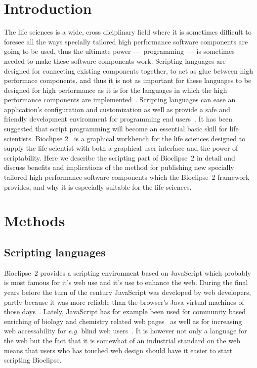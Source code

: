 \documentclass[10pt]{bmc_article}
\newenvironment{bmcformat}{\begin{raggedright}\baselineskip20pt\sloppy\setboolean{publ}{false}}{\end{raggedright}\baselineskip20pt\sloppy}
\begin{document}
\begin{bmcformat}
\section*{Introduction}
The life sciences is a wide, cross diciplinary field where it is sometimes
difficult to foresee all the ways specially tailored high performance software
components are going to be used, thus the ultimate power ---~programming~--- is
sometimes needed to make these software components work. Scripting languages
are designed for connecting existing components together, to act as glue
between high performace components, and thus it is not as important for these
languages to be designed for high performance as it is for the languages in
which the high performance components are implemented~\cite{Ousterhout:1998fk}.
Scripting languages can ease an application's configuration and customization
as well as provide a safe and friendly development environment for programming
end users~\cite{Spinellis:2005fk}.
\pb
It has been suggested that script programming will become an essential basic
skill for life scientists\cite{Aerts:2009uq}. Bioclipse 2~\cite{Spjuth:2009kx}
is a graphical workbench for the life sciences designed to supply the life
scientist with both a graphical user interface and the power of scriptability.
Here we describe the scripting part of Bioclipse~2 in detail and discuss
benefits and implications of the method for publishing new specially tailored
high performance software components which the Bioclipse~2 framework provides,
and why it is especially suitable for the life sciences.

\section*{Methods}

\subsection*{Scripting languages}
Bioclipse~2 provides a scripting environment based on JavaScript which probably
is most famous for it's web use and it's use to enhance the web. During the
final years before the turn of the century JavaScript was developed by web
developers, partly because it was more reliable than the browser's Java virtual
machines of those days~\cite{Loui:2008vn}. Lately, JavaScript has for example
been used for community based enriching of biology and chemistry related web
pages~\cite{Willighagen:2007kx} as well as for increasing web accessability for
\textit{e.g.} blind web users~\cite{Bigham:2007uq}. It is however not only a
language for the web but the fact that it is somewhat of an industrial standard
on the web means that users who has touched web design should have it easier to
start scripting Bioclipse. 
 

\end{bmcformat}
\end{document}
